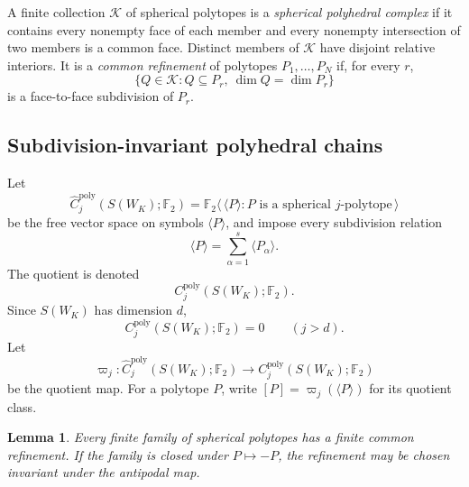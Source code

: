 \documentclass[reqno,12pt]{amsart}
\newtheorem{lemma}[theorem]{Lemma}
\theoremstyle{definition}
\newcommand{\F}{\mathbb F_2}
\begin{document}
A finite collection \(\mathcal K\) of spherical polytopes is a
\emph{spherical polyhedral complex} if it contains every nonempty face
of each member and every nonempty intersection of two members is a
common face.  Distinct members of \(\mathcal K\) have disjoint relative
interiors.  It is a \emph{common refinement} of polytopes
\(P_1,\ldots,P_N\)
if, for every \(r\),
\[
 \{Q\in\mathcal K:Q\subseteq P_r,\ \dim Q=\dim P_r\}
\]
is a face-to-face subdivision of \(P_r\).

\subsection{Subdivision-invariant polyhedral chains}

Let
\[
 \widehat C_j^{\mathrm{poly}}(S(W_K);\F)
 =\F\langle\,\langle P\rangle:
       P\text{ is a spherical \(j\)-polytope}\,\rangle
\]
be the free vector space on symbols \(\langle P\rangle\), and impose
every
subdivision relation
\[
 \langle P\rangle=\sum_{\alpha=1}^s\langle P_\alpha\rangle.
\]
The quotient is denoted
\[
 C_j^{\mathrm{poly}}(S(W_K);\F).
\]
Since \(S(W_K)\) has dimension \(d\),
\[
 C_j^{\mathrm{poly}}(S(W_K);\F)=0\qquad(j>d).
\]
Let
\[
 \varpi_j:\widehat C_j^{\mathrm{poly}}(S(W_K);\F)
 \longrightarrow C_j^{\mathrm{poly}}(S(W_K);\F)
\]
be the quotient map.  For a polytope \(P\), write
\([P]=\varpi_j(\langle P\rangle)\) for its quotient class.

\begin{lemma}
\label{lem:spherical-common-refinement}
Every finite family of spherical polytopes has a finite common
refinement.  If the family is closed under \(P\mapsto-P\), the
refinement may be chosen invariant under the antipodal map.
\end{lemma}
\end{document}
